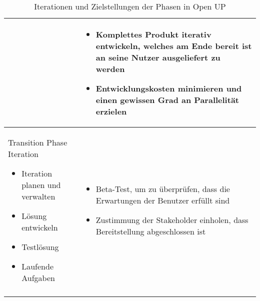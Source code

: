 \begin{longtable}{|p{7cm}|p{8cm}|}
\begin {itemize}
\end{itemize}

&
   \begin {itemize}
\item Komplettes Produkt iterativ entwickeln, welches am Ende bereit ist an seine Nutzer ausgeliefert zu werden
\item Entwicklungskosten minimieren und einen gewissen Grad an Parallelität erzielen 
\end{itemize}

 \\
\hline
Transition Phase Iteration 

   \begin {itemize}

 \item Iteration planen und verwalten
     \item Lösung entwickeln
   \item Testlösung
   \item Laufende Aufgaben

 \end{itemize}

 
  &
  
     \begin {itemize}
      \item Beta-Test, um zu überprüfen, dass die Erwartungen der Benutzer erfüllt sind 
     \item Zustimmung der Stakeholder einholen, dass Bereitstellung abgeschlossen ist
      \end{itemize}

\\

\hline

\caption{Iterationen und Zielstellungen der Phasen in Open UP \cite{eclipseopenup}}
\label{tab:tab1}
\end{longtable}






